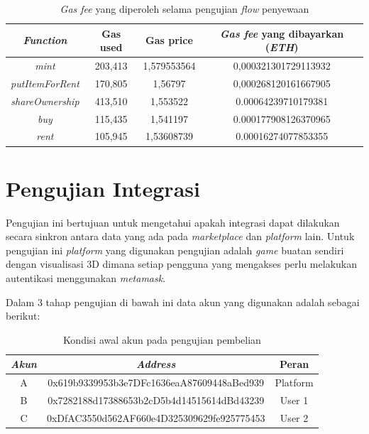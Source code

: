   \begin{longtable}{|c|c|c|c|}
      \caption{\emph{Gas fee} yang diperoleh selama pengujian \emph{flow} penyewaan}
    \label{tb:HasilShareOwnership}                                   \\
    \hline
    \rowcolor[HTML]{C0C0C0}
    \textbf{\emph{Function}} & \textbf{Gas used} & \textbf{Gas price} & \textbf{\emph{Gas fee} yang dibayarkan (\emph{ETH})}\\
    \hline
    \emph{mint}  & 203,413 & 1,579553564 & 0,000321301729113932    \\
    \emph{putItemForRent}  & 170,805 & 1,56797 & 0,000268120161667905    \\
    \emph{shareOwnership} & 413,510 &  1,553522 & 0.00064239710179381    \\
    \emph{buy} & 115,435 & 1,541197    & 0.000177908126370965    \\
    \emph{rent} & 105,945 & 1,53608739   & 0.00016274077853355    \\
    \hline
  \end{longtable}

\section{Pengujian Integrasi}
\label{sec:skenariopengujian}

Pengujian ini bertujuan untuk mengetahui apakah integrasi dapat dilakukan secara sinkron antara data yang ada pada \emph{marketplace} dan \emph{platform} lain. Untuk pengujian ini \emph{platform} yang digunakan pengujian adalah \emph{game} buatan sendiri dengan visualisasi 3D dimana setiap pengguna yang mengakses perlu melakukan autentikasi menggunakan \emph{metamask}. 

Dalam 3 tahap pengujian di bawah ini data akun yang digunakan adalah sebagai berikut:

\begin{longtable}{|c|c|c|}
    \caption{Kondisi awal akun pada pengujian pembelian}
    \label{tb:KondisiAwalPengujianPembelian}                                   \\
    \hline
    \rowcolor[HTML]{C0C0C0}
    \textbf{\emph{Akun}} & \textbf{\emph{Address}} & \textbf{Peran}\\
    \hline
    A & 0x619b9339953b3e7DFc1636eaA87609448aBed939            & Platform               \\
    B & 0x7282188d17388653b2cD5b4d14515614dBd43239            & User 1               \\
    C & 0xDfAC3550d562AF660e4D325309629fe925775453            & User 2               \\
    \hline
  \end{longtable}


